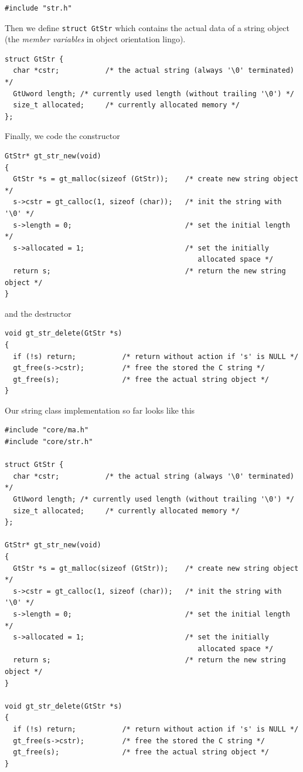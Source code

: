 \documentclass[11pt,final]{article}
\newcommand{\keyword}[1]{\lstinline{#1}}
\begin{document}
\begin{lstlisting}
#include "str.h"
\end{lstlisting}

Then we define \keyword{struct GtStr} which contains the actual data of a
string object (the \emph{member variables} in object orientation lingo).

\begin{lstlisting}
struct GtStr {
  char *cstr;           /* the actual string (always '\0' terminated) */
  GtUword length; /* currently used length (without trailing '\0') */
  size_t allocated;     /* currently allocated memory */
};
\end{lstlisting}

Finally, we code the constructor

\begin{lstlisting}
GtStr* gt_str_new(void)
{
  GtStr *s = gt_malloc(sizeof (GtStr));    /* create new string object */
  s->cstr = gt_calloc(1, sizeof (char));   /* init the string with '\0' */
  s->length = 0;                           /* set the initial length */
  s->allocated = 1;                        /* set the initially
                                              allocated space */
  return s;                                /* return the new string object */
}
\end{lstlisting}

and the destructor

\begin{lstlisting}
void gt_str_delete(GtStr *s)
{
  if (!s) return;           /* return without action if 's' is NULL */
  gt_free(s->cstr);         /* free the stored the C string */
  gt_free(s);               /* free the actual string object */
}
\end{lstlisting}

Our string class implementation so far looks like this

\begin{lstlisting}
#include "core/ma.h"
#include "core/str.h"

struct GtStr {
  char *cstr;           /* the actual string (always '\0' terminated) */
  GtUword length; /* currently used length (without trailing '\0') */
  size_t allocated;     /* currently allocated memory */
};

GtStr* gt_str_new(void)
{
  GtStr *s = gt_malloc(sizeof (GtStr));    /* create new string object */
  s->cstr = gt_calloc(1, sizeof (char));   /* init the string with '\0' */
  s->length = 0;                           /* set the initial length */
  s->allocated = 1;                        /* set the initially
                                              allocated space */
  return s;                                /* return the new string object */
}

void gt_str_delete(GtStr *s)
{
  if (!s) return;           /* return without action if 's' is NULL */
  gt_free(s->cstr);         /* free the stored the C string */
  gt_free(s);               /* free the actual string object */
}
\end{lstlisting}
\end{document}
